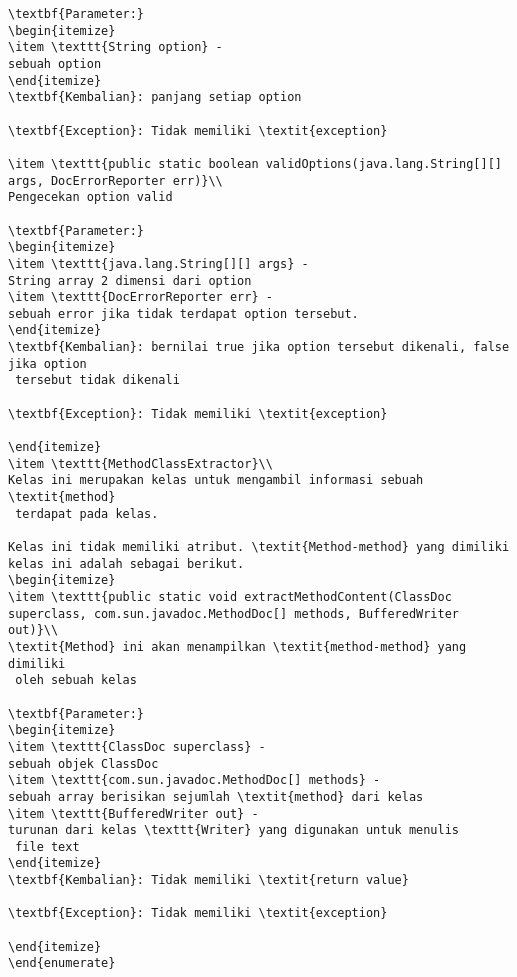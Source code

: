 \begin{lstlisting}[caption=Hasil Pengujian Kedua]
\textbf{Parameter:}
\begin{itemize}
\item \texttt{String option} - 
sebuah option
\end{itemize}
\textbf{Kembalian}: panjang setiap option

\textbf{Exception}: Tidak memiliki \textit{exception}

\item \texttt{public static boolean validOptions(java.lang.String[][] args, DocErrorReporter err)}\\ 
Pengecekan option valid

\textbf{Parameter:}
\begin{itemize}
\item \texttt{java.lang.String[][] args} - 
String array 2 dimensi dari option
\item \texttt{DocErrorReporter err} - 
sebuah error jika tidak terdapat option tersebut.
\end{itemize}
\textbf{Kembalian}: bernilai true jika option tersebut dikenali, false jika option
 tersebut tidak dikenali

\textbf{Exception}: Tidak memiliki \textit{exception}

\end{itemize}
\item \texttt{MethodClassExtractor}\\ 
Kelas ini merupakan kelas untuk mengambil informasi sebuah \textit{method}
 terdapat pada kelas.

Kelas ini tidak memiliki atribut. \textit{Method-method} yang dimiliki kelas ini adalah sebagai berikut.
\begin{itemize}
\item \texttt{public static void extractMethodContent(ClassDoc superclass, com.sun.javadoc.MethodDoc[] methods, BufferedWriter out)}\\ 
\textit{Method} ini akan menampilkan \textit{method-method} yang dimiliki
 oleh sebuah kelas

\textbf{Parameter:}
\begin{itemize}
\item \texttt{ClassDoc superclass} - 
sebuah objek ClassDoc
\item \texttt{com.sun.javadoc.MethodDoc[] methods} - 
sebuah array berisikan sejumlah \textit{method} dari kelas
\item \texttt{BufferedWriter out} - 
turunan dari kelas \texttt{Writer} yang digunakan untuk menulis
 file text
\end{itemize}
\textbf{Kembalian}: Tidak memiliki \textit{return value}

\textbf{Exception}: Tidak memiliki \textit{exception}

\end{itemize}
\end{enumerate}

\end{lstlisting}

